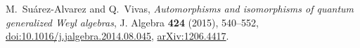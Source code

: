 M.~Su\'arez-Alvarez and Q.~Vivas,
\emph{Automorphisms and isomorphisms of quantum generalized Weyl algebras},
J. Algebra \textbf{424} (2015), 540--552,
\href{https://doi.org/10.1016/j.jalgebra.2014.08.045}{doi:10.1016/j.jalgebra.2014.08.045},
\href{https://arxiv.org/abs/1206.4417}{arXiv:1206.4417}.
